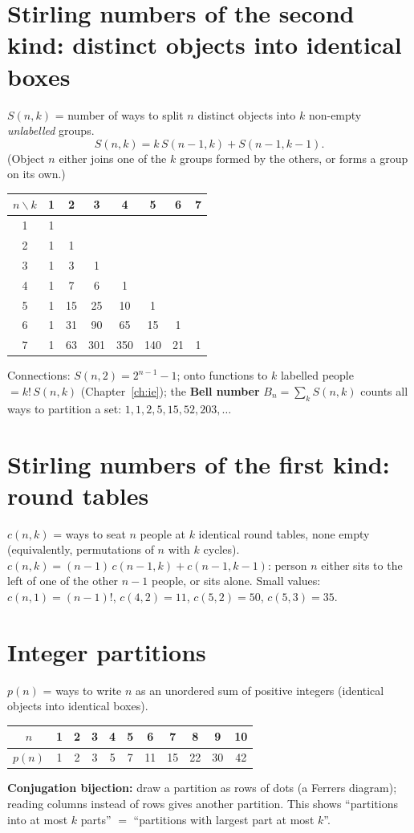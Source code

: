 \documentclass[11pt,a4paper,openany]{report}
\begin{document}
\section{Stirling numbers of the second kind: distinct objects into identical boxes}
$S(n,k)$ = number of ways to split $n$ distinct objects into $k$ non-empty \emph{unlabelled} groups.
\[S(n,k)=k\,S(n-1,k)+S(n-1,k-1).\]
(Object $n$ either joins one of the $k$ groups formed by the others, or forms a group on its own.)
\begin{center}\small
\begin{tabular}{c|ccccccc}
$n\backslash k$ & 1&2&3&4&5&6&7\\\hline
1&1\\
2&1&1\\
3&1&3&1\\
4&1&7&6&1\\
5&1&15&25&10&1\\
6&1&31&90&65&15&1\\
7&1&63&301&350&140&21&1\\
\end{tabular}
\end{center}
Connections: $S(n,2)=2^{n-1}-1$; onto functions to $k$ labelled people $=k!\,S(n,k)$ (Chapter~\ref{ch:ie});
the \textbf{Bell number} $B_n=\sum_kS(n,k)$ counts all ways to partition a set: $1,1,2,5,15,52,203,\dots$

\section{Stirling numbers of the first kind: round tables}
$c(n,k)$ = ways to seat $n$ people at $k$ identical round tables, none empty (equivalently, permutations of
$n$ with $k$ cycles). $c(n,k)=(n-1)\,c(n-1,k)+c(n-1,k-1)$: person $n$ either sits to the left of one of the other
$n-1$ people, or sits alone. Small values: $c(n,1)=(n-1)!$, $c(4,2)=11$, $c(5,2)=50$, $c(5,3)=35$.

\section{Integer partitions}
$p(n)$ = ways to write $n$ as an unordered sum of positive integers (identical objects into identical boxes).
\begin{center}\small
\begin{tabular}{c|cccccccccc}
$n$&1&2&3&4&5&6&7&8&9&10\\\hline
$p(n)$&1&2&3&5&7&11&15&22&30&42
\end{tabular}
\end{center}
\textbf{Conjugation bijection:} draw a partition as rows of dots (a Ferrers diagram); reading columns instead
of rows gives another partition. This shows ``partitions into at most $k$ parts'' $=$ ``partitions with largest part at most $k$''.
\end{document}
